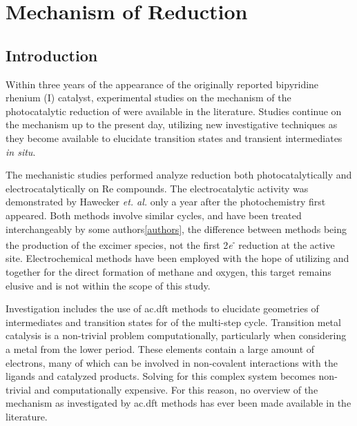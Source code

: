 \chapter{Mechanism of \texorpdfstring{}{CO2} Reduction}\label{chap.mech}

\section{Introduction}

Within three years of the appearance of the originally reported bipyridine rhenium (I) catalyst, experimental studies on the mechanism of the photocatalytic reduction of  were available in the literature\autocite{hawecker1986}. Studies continue on the mechanism up to the present day\autocite{johnson1996, koike2002, takeda2008, smieja2012, machan2014, kou2014}, utilizing new investigative techniques as they become available to elucidate transition states and transient intermediates \textit{in situ}. 

The mechanistic studies performed analyze  reduction both photocatalytically and electrocatalytically on Re compounds. The electrocatalytic activity was demonstrated by Hawecker \textit{et. al.} only a year after the photochemistry first appeared\autocite{hawecker1984}. Both methods involve similar cycles, and have been treated interchangeably by some authors\ref{authors}, the difference between methods being the production of the excimer species, not the first 2\textit{e}\textsuperscript{-} reduction at the active site. Electrochemical methods have been employed with the hope of utilizing  and  together for the direct formation of methane and oxygen, this target remains elusive and is not within the scope of this study.

Investigation includes the use of \gls{ac.dft} methods to elucidate geometries of intermediates and transition states for of the multi-step cycle. Transition metal catalysis is a non-trivial problem computationally, particularly when considering a metal from the lower period. These elements contain a large amount of electrons, many of which can be involved in non-covalent interactions with the ligands and catalyzed products. Solving for this complex system becomes non-trivial and computationally expensive. For this reason, no overview of the mechanism as investigated by \gls{ac.dft} methods has ever been made available in the literature. 

